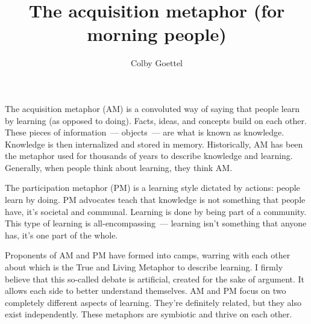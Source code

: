 \documentclass[12pt]{article}
\title{The acquisition metaphor (for morning people)}
\author{Colby Goettel}
\begin{document}
\maketitle


The acquisition metaphor (AM) is a convoluted way of saying that people learn by learning (as opposed to doing). Facts, ideas, and concepts build on each other. These pieces of information~--- objects~--- are what is known as knowledge. Knowledge is then internalized and stored in memory. Historically, AM has been the metaphor used for thousands of years to describe knowledge and learning. Generally, when people think about learning, they think AM.

The participation metaphor (PM) is a learning style dictated by actions: people learn by doing. PM advocates teach that knowledge is not something that people have, it's societal and communal. Learning is done by being part of a community. This type of learning is all-encompassing~--- learning isn't something that anyone has, it's one part of the whole.

Proponents of AM and PM have formed into camps, warring with each other about which is the True and Living Metaphor to describe learning. I firmly believe that this so-called debate is artificial, created for the sake of argument. It allows each side to better understand themselves. AM and PM focus on two completely different aspects of learning. They're definitely related, but they also exist independently. These metaphors are symbiotic and thrive on each other.
\end{document}
